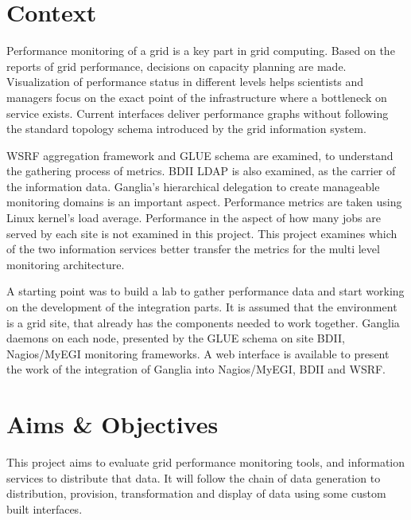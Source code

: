 
\section{Context}

Performance monitoring of a grid is a key part in grid computing. Based on the reports of grid performance, decisions on capacity planning are made. Visualization of performance status in different levels helps scientists and managers focus on the exact point of the infrastructure where a bottleneck on service exists.
Current interfaces deliver performance graphs without following the standard topology schema introduced by the grid information system.

\ac{WSRF} aggregation framework and \ac{GLUE} schema are examined, to understand the gathering process of metrics. \ac{BDII} LDAP is also examined, as the carrier of the information data. Ganglia's hierarchical delegation to create manageable monitoring domains is an important aspect. Performance metrics are taken using Linux kernel's load average.
Performance in the aspect of how many jobs are served by each site is not examined in this project.
This project examines which of the two information services better transfer the metrics for the multi level monitoring architecture.

A starting point was to build a lab to gather performance data and start working on the development of the integration parts.
It is assumed that the environment is a grid site, that already has the components needed to work together. Ganglia daemons on each node, presented by the \ac{GLUE} schema on site \ac{BDII}, Nagios/MyEGI monitoring frameworks.
A web interface is available to present the work of the integration of Ganglia into Nagios/MyEGI, \ac{BDII} and \ac{WSRF}.

\section{Aims \& Objectives}

This project aims to evaluate grid performance monitoring tools, and information services to distribute that data. It will follow the chain of data generation to distribution, provision, transformation and display of data using some custom built interfaces.

